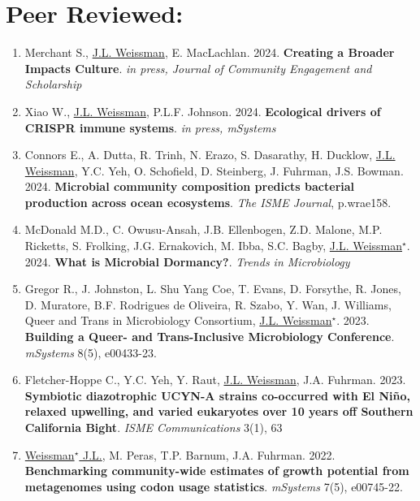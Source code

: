 \documentclass[]{res}
\begin{document}
\begin{resume}
\begin{enumerate}[leftmargin=*]
  \end{enumerate} 

  
 \section{Peer Reviewed:} \vspace{0mm}
 
\begin{enumerate}[leftmargin=*]
 \setlength\itemsep{0.25em}
 
 \item Merchant S., \underline{J.L. Weissman}, E. MacLachlan. 2024. {\bf Creating a Broader Impacts Culture}. \emph{in press, Journal of Community Engagement and Scholarship}
 
 \item Xiao W., \underline{J.L. Weissman}, P.L.F. Johnson. 2024. {\bf Ecological drivers of CRISPR immune systems}. \emph{in press, mSystems}
 
 \item Connors E., A. Dutta, R. Trinh, N. Erazo, S. Dasarathy, H. Ducklow, \underline{J.L. Weissman}, Y.C. Yeh, O. Schofield, D. Steinberg, J. Fuhrman, J.S. Bowman. 2024. {\bf Microbial community composition predicts bacterial production across ocean ecosystems}. \emph{The ISME Journal}, p.wrae158.

 \item McDonald M.D., C. Owusu-Ansah, J.B. Ellenbogen, Z.D. Malone, M.P. Ricketts, S. Frolking, J.G. Ernakovich, M. Ibba, S.C. Bagby, \underline{J.L. Weissman$^\star$}. 2024. {\bf What is Microbial Dormancy?}. \emph{Trends in Microbiology}

 \item Gregor R., J. Johnston, L. Shu Yang Coe, T. Evans, D. Forsythe, R. Jones, D. Muratore, B.F. Rodrigues de Oliveira, R. Szabo, Y. Wan, J. Williams, Queer and Trans in Microbiology Consortium, \underline{J.L. Weissman$^\star$}. 2023. {\bf Building a Queer- and Trans-Inclusive Microbiology Conference}. \emph{mSystems} 8(5), e00433-23.
 
\item Fletcher-Hoppe C., Y.C. Yeh, Y. Raut, \underline{J.L. Weissman}, J.A. Fuhrman. 2023. {\bf Symbiotic diazotrophic UCYN-A strains co-occurred with El Niño, relaxed upwelling, and varied eukaryotes over 10 years off Southern California Bight}. \emph{ISME Communications} 3(1), 63
 
  \item \underline{Weissman$^\star$ J.L.}, M. Peras, T.P. Barnum, J.A. Fuhrman. 2022. {\bf Benchmarking community-wide estimates of growth potential from metagenomes using codon usage statistics}. \emph{mSystems} 7(5), e00745-22.
  

\end{enumerate}
\end{resume}
\end{document}
